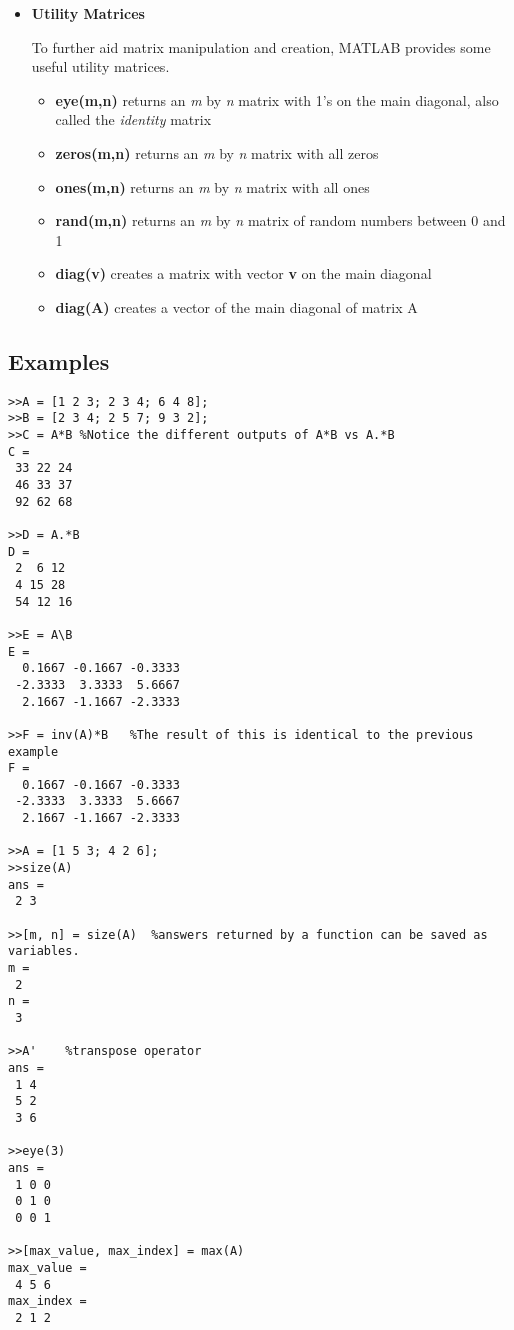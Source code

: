 \documentclass[paper=a4, fontsize=11pt]{scrartcl} %
\numberwithin{equation}{section} %
\numberwithin{figure}{section} %
\numberwithin{table}{section} %
\begin{document}
\begin{itemize}
\item \textbf{Utility Matrices}

To further aid matrix manipulation and creation, MATLAB provides some useful utility matrices. 
\begin{itemize}
	\item \textbf{eye(m,n)} returns an \textit{m} by \textit{n} matrix with 1's on the main diagonal, also called the \textit{identity} matrix
	\item \textbf{zeros(m,n)} returns an \textit{m} by \textit{n} matrix with all zeros
	\item \textbf{ones(m,n)} returns an \textit{m} by \textit{n} matrix with all ones
	\item \textbf{rand(m,n)} returns an \textit{m} by \textit{n} matrix of random numbers between 0 and 1
	\item \textbf{diag(v)} creates a matrix with vector \textbf{v} on the main diagonal
	\item \textbf{diag(A)} creates a vector of the main diagonal of matrix A
\end{itemize}
\end{itemize}

\subsection{Examples}

\begin{verbatim}
>>A = [1 2 3; 2 3 4; 6 4 8];
>>B = [2 3 4; 2 5 7; 9 3 2];
>>C = A*B %Notice the different outputs of A*B vs A.*B 
C = 
 33 22 24
 46 33 37
 92 62 68
 
>>D = A.*B
D = 
 2  6 12
 4 15 28
 54 12 16
 
>>E = A\B
E = 
  0.1667 -0.1667 -0.3333
 -2.3333  3.3333  5.6667
  2.1667 -1.1667 -2.3333

>>F = inv(A)*B	 %The result of this is identical to the previous example
F =     	
  0.1667 -0.1667 -0.3333
 -2.3333  3.3333  5.6667
  2.1667 -1.1667 -2.3333 	

>>A = [1 5 3; 4 2 6];
>>size(A)
ans = 
 2 3
 
>>[m, n] = size(A)  %answers returned by a function can be saved as variables.
m = 
 2
n = 
 3
 
>>A' 	%transpose operator
ans = 
 1 4
 5 2
 3 6
 
>>eye(3)
ans = 
 1 0 0
 0 1 0
 0 0 1
 
>>[max_value, max_index] = max(A)
max_value = 
 4 5 6
max_index = 
 2 1 2

\end{verbatim}
\end{document}
